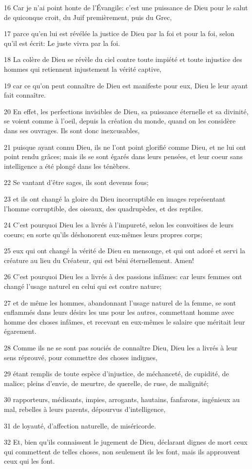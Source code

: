 \par 16 Car je n'ai point honte de l'Évangile: c'est une puissance de Dieu pour le salut de quiconque croit, du Juif premièrement, puis du Grec,
\par 17 parce qu'en lui est révélée la justice de Dieu par la foi et pour la foi, selon qu'il est écrit: Le juste vivra par la foi.
\par 18 La colère de Dieu se révèle du ciel contre toute impiété et toute injustice des hommes qui retiennent injustement la vérité captive,
\par 19 car ce qu'on peut connaître de Dieu est manifeste pour eux, Dieu le leur ayant fait connaître.
\par 20 En effet, les perfections invisibles de Dieu, sa puissance éternelle et sa divinité, se voient comme à l'oeil, depuis la création du monde, quand on les considère dans ses ouvrages. Ils sont donc inexcusables,
\par 21 puisque ayant connu Dieu, ils ne l'ont point glorifié comme Dieu, et ne lui ont point rendu grâces; mais ils se sont égarés dans leurs pensées, et leur coeur sans intelligence a été plongé dans les ténèbres.
\par 22 Se vantant d'être sages, ils sont devenus fous;
\par 23 et ils ont changé la gloire du Dieu incorruptible en images représentant l'homme corruptible, des oiseaux, des quadrupèdes, et des reptiles.
\par 24 C'est pourquoi Dieu les a livrés à l'impureté, selon les convoitises de leurs coeurs; en sorte qu'ils déshonorent eux-mêmes leurs propres corps;
\par 25 eux qui ont changé la vérité de Dieu en mensonge, et qui ont adoré et servi la créature au lieu du Créateur, qui est béni éternellement. Amen!
\par 26 C'est pourquoi Dieu les a livrés à des passions infâmes: car leurs femmes ont changé l'usage naturel en celui qui est contre nature;
\par 27 et de même les hommes, abandonnant l'usage naturel de la femme, se sont enflammés dans leurs désirs les uns pour les autres, commettant homme avec homme des choses infâmes, et recevant en eux-mêmes le salaire que méritait leur égarement.
\par 28 Comme ils ne se sont pas souciés de connaître Dieu, Dieu les a livrés à leur sens réprouvé, pour commettre des choses indignes,
\par 29 étant remplis de toute espèce d'injustice, de méchanceté, de cupidité, de malice; pleins d'envie, de meurtre, de querelle, de ruse, de malignité;
\par 30 rapporteurs, médisants, impies, arrogants, hautains, fanfarons, ingénieux au mal, rebelles à leurs parents, dépourvus d'intelligence,
\par 31 de loyauté, d'affection naturelle, de miséricorde.
\par 32 Et, bien qu'ils connaissent le jugement de Dieu, déclarant dignes de mort ceux qui commettent de telles choses, non seulement ils les font, mais ils approuvent ceux qui les font.


